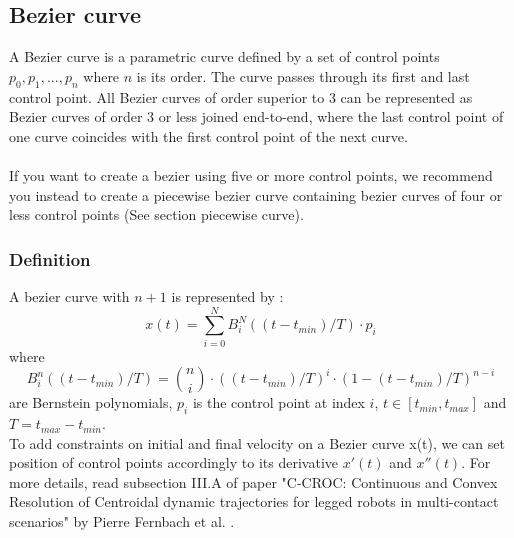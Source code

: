 \documentclass{article}
\begin{document}
\subsection{Bezier curve}

    A Bezier curve is a parametric curve defined by a set of control points ${p_0, p_1, ..., p_n}$ where $n$ is its order. The curve passes through its first and last control point.
    All Bezier curves of order superior to 3 can be represented as Bezier curves of order 3 or less joined end-to-end, where the last control point of one curve coincides with the first control point of the next curve. \\\\

    If you want to create a bezier using five or more control points, we recommend you instead to create a piecewise bezier curve containing bezier curves of four or less control points
    (See section piecewise curve).

    \subsubsection{Definition}
    A bezier curve with $n+1$ is represented by :
    \begin{equation}\label{eq:bezierBernstein}
    x(t) = \sum_{i=0}^{N} B_i^N((t-t_{min})/T) \cdot p_i
    \end{equation}
    where
    \begin{equation}\label{eq:bernstein}
    B_i^n((t-t_{min})/T) = \binom{n}{i} \cdot ((t-t_{min})/T)^i \cdot (1-(t-t_{min})/T)^{n-i}
    \end{equation}
    are Bernstein polynomials, $p_i$ is the control point at index $i$, $t \in [t_{min},t_{max}]$ and $T=t_{max}-t_{min}$.\\

    To add constraints on initial and final velocity on a Bezier curve x(t), we can set position of control points accordingly to its derivative $x'(t)$ and $x''(t)$. For more details, read subsection III.A of paper "C-CROC: Continuous and Convex Resolution of Centroidal dynamic trajectories for legged robots in multi-contact scenarios" by Pierre Fernbach et al. .
\end{document}
